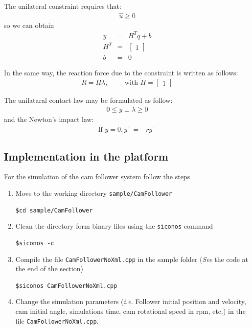 The unilateral constraint requires that:
\begin{eqnarray}
\label{eq:constr} \nonumber
 \hat u \geq 0
\end{eqnarray}
so we can obtain
\begin{eqnarray}
y &= & H^T q + b \\
\nonumber H^T &=&\left[\begin{array}{c} 1 \end{array}\right]\\
\nonumber b&=&0
\end{eqnarray}

In the same way, the reaction force due to the constraint is
written as follows:
\begin{eqnarray}
\nonumber R=H \lambda, \hspace{1cm}  \text{with }
H=\left[\begin{array}{c} 1
\end{array}\right]
\end{eqnarray}

The unilataral contact law may be formulated as follow:
\begin{eqnarray}
  \label{eq:119}
  0 \leq y \perp \lambda\geq 0
\end{eqnarray}
and the Newton's impact law:
\begin{eqnarray}
  \label{eq:120}
\text{If } y=0, \dot{y}^+ =-r\dot{y}^-
\end{eqnarray}

\subsection{Implementation in the platform}
For the simulation of the cam follower system follow the steps

\begin{enumerate}
\item Move to the working directory \verb"sample/CamFollower"

\verb"$cd sample/CamFollower "

\item Clean the directory form binary files using the
\verb"siconos" command

\verb"$siconos -c "

\item Compile the file \verb"CamFollowerNoXml.cpp" in
the sample folder ({\em See} the code at the end of the section)

\verb"$siconos CamFollowerNoXml.cpp"

\item Change the simulation parameters ({\em i.e.}
Follower initial position and velocity, cam initial angle,
simulations time, cam rotational speed in rpm, etc.) in the file
\verb"CamFollowerNoXml.cpp".

\end{enumerate}

